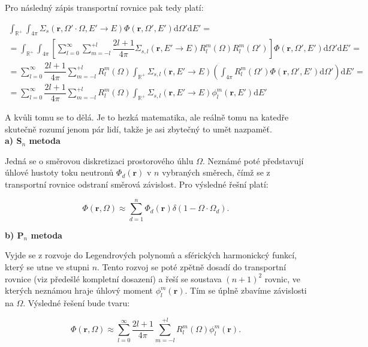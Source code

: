Pro následný zápis transportní rovnice pak tedy platí:

\begin{equation*}
  \begin{multlined}
    \int_\mathbb{R^+} \int_{4 \pi} \Sigma_s(\textbf{r}, \Omega' \cdot \Omega, E' \rightarrow E) \Phi(\textbf{r}, \Omega', E') \text{d}\Omega' \text{d}E' = \\
    = \int_\mathbb{R^+} \int_{4 \pi} \left [ \sum_{l=0}^{\infty} \sum_{m=-l}^{+l} \dfrac{2l + 1}{4 \pi} \Sigma_{s,l}(\textbf{r}, E' \rightarrow E) R_l^m(\Omega) R_l^m(\Omega') \right ] \Phi(\textbf{r}, \Omega', E') \text{d}\Omega' \text{d}E' = \\
    = \sum_{l=0}^{\infty} \dfrac{2l + 1}{4 \pi} \sum_{m=-l}^{+l} R_l^m(\Omega) \int_\mathbb{R^+} \Sigma_{s,l}(\textbf{r}, E' \rightarrow E) \left ( \int_{4 \pi} R_l^m(\Omega') \Phi(\textbf{r}, \Omega', E') \text{d}\Omega' \right ) \text{d}E' =\\
    = \sum_{l=0}^{\infty} \dfrac{2l + 1}{4 \pi} \sum_{m=-l}^{+l} R_l^m(\Omega) \int_\mathbb{R^+} \Sigma_{s,l}(\textbf{r}, E' \rightarrow E) \phi_l^m(\textbf{r}, E') \text{d}E'
  \end{multlined}
\end{equation*}

A kvůli tomu se to dělá. Je to hezká matematika, ale reálně tomu na katedře skutečně rozumí jenom pár lidí, takže je asi zbytečný to umět nazpaměť.\\

\noindent \textbf{a) S$_n$ metoda}

Jedná se o směrovou diskretizaci prostorového úhlu $\Omega$. Neznámé poté představují úhlové hustoty toku neutronů $\Phi_d(\textbf{r})$ v $n$ vybraných směrech, čímž se z transportní rovnice odstraní směrová závislost. Pro výsledné řešní platí:

$$\Phi(\textbf{r}, \Omega) \approx \sum_{d=1}^{n} \Phi_d(\textbf{r}) \delta(1-\Omega \cdot \Omega_d).$$

\noindent \textbf{b) P$_n$ metoda}

Vyjde se z rozvoje do Legendrových polynomů a sférických harmonickcý funkcí, který se utne ve stupni $n$. Tento rozvoj se poté zpětně dosadí do transportní rovnice (viz předešlé kompletní dosazení) a řeší se soustava $(n+1)^2$ rovnic, ve kterých neznámou hraje úhlový moment $\phi_l^m(\textbf{r})$. Tím se úplně zbavíme závislosti na $\Omega$. Výsledné řešení bude tvaru:

$$\Phi(\textbf{r}, \Omega) \approx \sum_{l=0}^{\infty} \dfrac{2l + 1}{4 \pi} \sum_{m=-l}^{+l} R_l^m(\Omega)  \phi_l^m(\textbf{r}). $$

